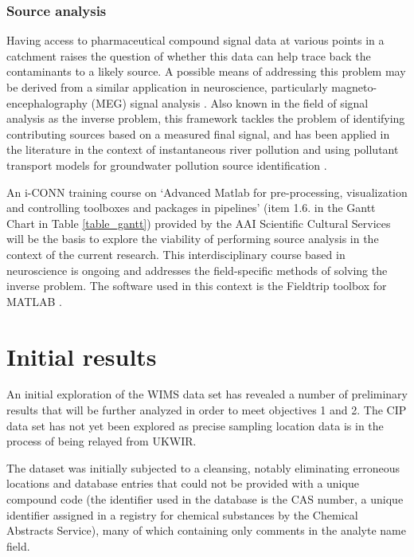 \documentclass{article}
\begin{document}
\subsubsection{Source analysis}
 \label{source_analysis}
Having access to pharmaceutical compound signal data at various points in a catchment raises the question of whether this data can help trace back the contaminants to a likely source. A possible means of addressing this problem may be derived from a similar application in neuroscience, particularly magneto-encephalography (MEG) signal analysis \citep{Taylor1999MathematicalExpansions}.  Also known in the field of signal analysis as the inverse problem, this framework tackles the problem of identifying contributing sources based on a measured final signal, and has been applied in the literature in the context of instantaneous river pollution \citep{Han2014InverseAccuracy} and using pollutant transport models for groundwater pollution source identification \citep{Gurarslan2015SolvingAlgorithm,Jamshidi2020SolvingOptimization}. 

An i-CONN training course on ‘Advanced Matlab for pre-processing, visualization and controlling toolboxes and packages in pipelines’ (item 1.6. in the Gantt Chart in Table \ref{table_gantt}) provided by the AAI Scientific Cultural Services will be the basis to explore the viability of performing source analysis in the context of the current research. This interdisciplinary course based in neuroscience is ongoing and addresses the field-specific methods of solving the inverse problem. The software used in this context is the Fieldtrip toolbox for MATLAB \citep{Oostenveld2011FieldTrip:Data}.

\clearpage
\section{Initial results}
An initial exploration of the WIMS data set has revealed a number of preliminary results that will be further analyzed in order to meet objectives 1 and 2. The CIP data set has not yet been explored as precise sampling location data is in the process of being relayed from UKWIR.

The dataset was initially subjected to a cleansing, notably eliminating erroneous locations and database entries that could not be provided with a unique compound code (the identifier used in the database is the CAS number, a unique identifier assigned in a registry for chemical substances by the Chemical Abstracts Service), many of which containing only comments in the analyte name field.
\end{document}
